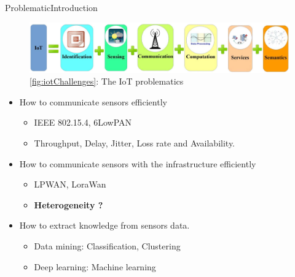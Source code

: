 		\begin{frame}[noframenumbering]{Problematic}{Introduction}
		\begin{figure}
		\includegraphics[width=.7\columnwidth]{res/iotChallenges.png}
		\caption*{ \ref{fig:iotChallenges}: The IoT problematics}
	\end{figure}
		\begin{itemize}
		\item How to communicate sensors efficiently
			\begin{itemize}
				\item IEEE 802.15.4, 6LowPAN
				\item Throughput, Delay, Jitter, Loss rate and Availability.
			\end{itemize}
		\item How to communicate sensors with the infrastructure efficiently
			\begin{itemize}
				\item LPWAN, LoraWan
				\item \textbf{Heterogeneity ?}
			\end{itemize}
		\item How to extract knowledge from sensors data.
			\begin{itemize}
				\item Data mining: Classification, Clustering
				\item Deep learning: Machine learning
			\end{itemize}
		\end{itemize}
		\end{frame}


